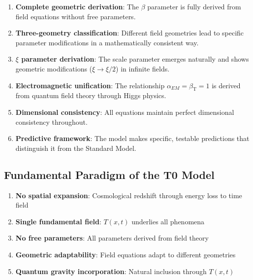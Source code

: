 \documentclass[12pt,a4paper]{article}
\newcommand{\betaT}{\beta_{\text{T}}}
\begin{document}
	\begin{enumerate}
		\item \textbf{Complete geometric derivation}: The $\beta$ parameter is fully derived from field equations without free parameters.
		
		\item \textbf{Three-geometry classification}: Different field geometries lead to specific parameter modifications in a mathematically consistent way.
		
		\item \textbf{$\xi$ parameter derivation}: The scale parameter emerges naturally and shows geometric modifications ($\xi \to \xi/2$) in infinite fields.
		
		\item \textbf{Electromagnetic unification}: The relationship $\alpha_{EM} = \betaT = 1$ is derived from quantum field theory through Higgs physics.
		
		\item \textbf{Dimensional consistency}: All equations maintain perfect dimensional consistency throughout.
		
		\item \textbf{Predictive framework}: The model makes specific, testable predictions that distinguish it from the Standard Model.
	\end{enumerate}
	
	\subsection{Fundamental Paradigm of the T0 Model}
	\label{subsec:fundamental_paradigm}
	
	\begin{tcolorbox}[colback=green!5!white,colframe=green!75!black,title=T0 Model Core Principles]
		\begin{enumerate}
			\item \textbf{No spatial expansion}: Cosmological redshift through energy loss to time field
			\item \textbf{Single fundamental field}: $T(x,t)$ underlies all phenomena
			\item \textbf{No free parameters}: All parameters derived from field theory
			\item \textbf{Geometric adaptability}: Field equations adapt to different geometries
			\item \textbf{Quantum gravity incorporation}: Natural inclusion through $T(x,t)$
		\end{enumerate}
	\end{tcolorbox}
	
\end{document}
